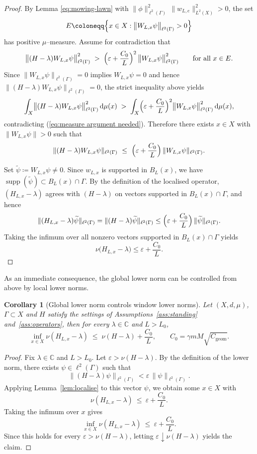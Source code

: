 \documentclass[11pt]{article}
\newtheorem{corollary}[theorem]{Corollary}
\theoremstyle{definition}
\newcommand{\C}{\mathbb{C}}
\newcommand{\supp}{\operatorname{supp}}
\newcommand{\nuop}{\nu}
\begin{document}
\begin{proof}
By Lemma \eqref{eq:mowing-lawn} with $\|\phi\|_{\ell^2(\Gamma)}^2\,\|w_{L,e}\|_{L^2(X)}^2 > 0$, the set
\[
  E\coloneqq \Bigl\{x\in X:\bigl\|W_{L,x}\psi\bigr\|_{\ell^2(\Gamma)}>0\Bigr\}
\]
has positive $\mu$--measure. Assume for contradiction that
\[
  \bigl\|(H - \lambda ) W_{L,x} \psi\bigr\|_{\ell^2(\Gamma)}^2
  \;>\;
  \Bigl(\varepsilon + \frac{C_0}{L}\Bigr)^{2}\,\bigl\|W_{L,x}\psi\bigr\|_{\ell^2(\Gamma)}^2
  \qquad \text{for all }x\in E .
\]
Since $\bigl\|W_{L,x}\psi\bigr\|_{\ell^2(\Gamma)}=0$ implies $W_{L,x}\psi=0$ and hence
$\bigl\|(H-\lambda)W_{L,x}\psi\bigr\|_{\ell^2(\Gamma)}=0$, the strict inequality above yields
\[
\int_{X} \bigl\|(H - \lambda ) W_{L,x} \psi\bigr\|_{\ell^2(\Gamma)}^2\,\mathrm{d}\mu(x)
 \;>\;
\int_{X} \Bigl(\varepsilon + \frac{C_0}{L}\Bigr)^{2}
                 \bigl\|W_{L,x}\psi\bigr\|_{\ell^2(\Gamma)}^2\,\mathrm{d}\mu(x),
\]
contradicting (\ref{eq:measure argument needed}). Therefore there exists
$x\in X$ with $\|W_{L,x}\psi\|>0$ such that
\[
  \|(H-\lambda)W_{L,x}\psi\|_{\ell^2(\Gamma)}
  \ \le\
  \Bigl( \varepsilon + \frac{C_0}{L} \Bigr)\,\|W_{L,x}\psi\|_{\ell^2(\Gamma)}.
\]

Set $\widetilde{\psi}\coloneqq W_{L,x}\psi\neq 0$. Since $w_{L,x}$ is supported in
$B_L(x)$, we have $\supp(\widetilde{\psi})\subset B_L(x)\cap\Gamma$. By the
definition of the localised operator, $(H_{L,x}-\lambda)$ agrees with
$(H-\lambda)$ on vectors supported in $B_L(x)\cap\Gamma$, and hence
\[
  \|(H_{L,x}-\lambda)\widetilde{\psi}\|_{\ell^2(\Gamma)}
  = \|(H-\lambda)\widetilde{\psi}\|_{\ell^2(\Gamma)}
  \le \Bigl(\varepsilon+\frac{C_0}{L}\Bigr)\,\|\widetilde{\psi}\|_{\ell^2(\Gamma)}.
\]
Taking the infimum over all nonzero vectors supported in $B_L(x)\cap\Gamma$
yields
\[
  \nu\bigl(H_{L,x}-\lambda\bigr)\le \varepsilon+\frac{C_0}{L}.
\] 
\end{proof}

As an immediate consequence, the global lower norm can be controlled from above
by local lower norms.

\begin{corollary}[Global lower norm controls window lower norms]\label{cor:global-local}
Let $(X,d,\mu)$, $\Gamma \subset X$ and $H$ satisfy the settings of Assumptions~\ref{ass:standing}
and~\ref{ass:operators}, then for every $\lambda\in\C$ and $L>L_0$,
\[
  \inf_{x\in X}\nuop(H_{L,x}-\lambda)
  \;\le\;
  \nuop(H-\lambda)+\frac{C_0}{L}, \qquad
  C_0=\gamma mM\sqrt{C_{\mathrm{geom}}}.
\]
\end{corollary}

\begin{proof}
Fix $\lambda\in\C$ and $L>L_0$.  Let $\varepsilon>\nuop(H-\lambda)$.  By the definition
of the lower norm, there exists $\psi\in\ell^2(\Gamma)$ such that
\[
  \|(H-\lambda)\psi\|_{\ell^2(\Gamma)} < \varepsilon \, \|\psi\|_{\ell^2(\Gamma)}.
\]
Applying Lemma~\ref{lem:localise} to this vector $\psi$, we obtain some $x\in X$ with
\[
  \nuop(H_{L,x}-\lambda)\ \le\ \varepsilon+\frac{C_0}{L}.
\]
Taking the infimum over $x$ gives
\[
  \inf_{x\in X}\nuop(H_{L,x}-\lambda)\ \le\ \varepsilon+\frac{C_0}{L}.
\]
Since this holds for every $\varepsilon>\nuop(H-\lambda)$, letting $\varepsilon\downarrow\nuop(H-\lambda)$ yields the claim.
\end{proof}
\end{document}
